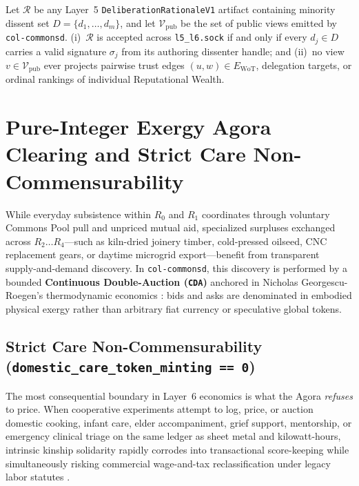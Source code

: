 \begin{invariant}
\label{inv:dissent-and-privacy}
Let $\mathcal{R}$ be any Layer~5 \texttt{DeliberationRationaleV1} artifact containing minority dissent set $D = \{d_1, \dots, d_m\}$, and let $\mathcal{V}_{\mathrm{pub}}$ be the set of public views emitted by \texttt{col-commonsd}. (i)~$\mathcal{R}$ is accepted across \texttt{l5\_l6.sock} if and only if every $d_j \in D$ carries a valid signature $\sigma_j$ from its authoring dissenter handle; and (ii)~no view $v \in \mathcal{V}_{\mathrm{pub}}$ ever projects pairwise trust edges $(u, w) \in E_{\mathrm{WoT}}$, delegation targets, or ordinal rankings of individual Reputational Wealth.
\end{invariant}

\section{Pure-Integer Exergy Agora Clearing and Strict Care Non-Commensurability}
\label{sec:agora-cda-clearing}

While everyday subsistence within $R_0$ and $R_1$ coordinates through voluntary Commons Pool pull and unpriced mutual aid, specialized surpluses exchanged across $R_2 \dots R_4$---such as kiln-dried joinery timber, cold-pressed oilseed, CNC replacement gears, or daytime microgrid export---benefit from transparent supply-and-demand discovery. In \texttt{col-commonsd}, this discovery is performed by a bounded \textbf{Continuous Double-Auction (\texttt{CDA})} \parencite{smith1962experimental} anchored in Nicholas Georgescu-Roegen's thermodynamic economics \parencite{georgescu1971}: bids and asks are denominated in embodied physical exergy rather than arbitrary fiat currency or speculative global tokens.

\subsection{Strict Care Non-Commensurability (\texttt{domestic\_care\_token\_minting == 0})}

The most consequential boundary in Layer~6 economics is what the Agora \emph{refuses} to price. When cooperative experiments attempt to log, price, or auction domestic cooking, infant care, elder accompaniment, grief support, mentorship, or emergency clinical triage on the same ledger as sheet metal and kilowatt-hours, intrinsic kinship solidarity rapidly corrodes into transactional score-keeping \parencite{illich1973,han2015} while simultaneously risking commercial wage-and-tax reclassification under legacy labor statutes \parencite{alamo1985}.

